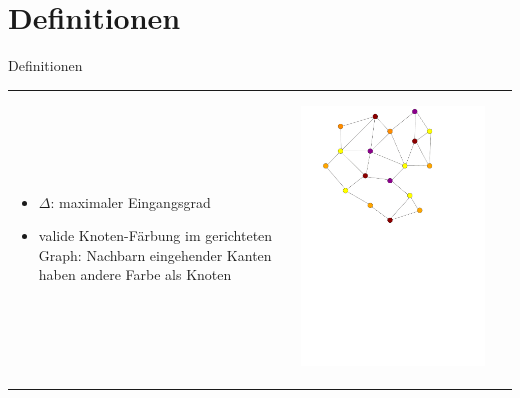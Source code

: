\documentclass[18pt]{beamer}
\begin{document}
\section{Definitionen}
\begin{frame}{Definitionen}
\begin{tabular}{l l}
\begin{minipage}{0.5\textwidth}
	\begin{itemize}
		\item $\Delta$: maximaler Eingangsgrad
		\item valide Knoten-Färbung im gerichteten Graph: Nachbarn eingehender Kanten haben andere Farbe als Knoten
	\end{itemize}
\end{minipage}
&
\begin{minipage}{0.5\textwidth}
	
	\begin{center}
		\includegraphics[width=0.90\textwidth, page=2]{pdf/nodecoloring.pdf}
	\end{center}
\end{minipage}
\end{tabular}
\end{frame}
\end{document}
